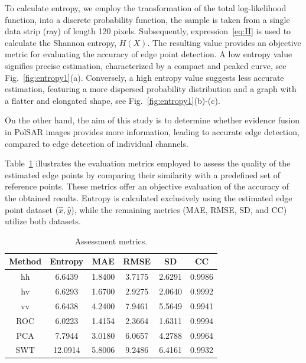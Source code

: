 \documentclass{article}
\begin{document}
To calculate entropy,  we employ the transformation of the total log-likelihood function, into a discrete probability function, the sample is taken from a single data strip (ray) of length 120 pixels.  Subsequently, expression~\eqref{eq:H} is used to calculate the Shannon entropy, $H(X)$. The resulting value provides an objective metric for evaluating the accuracy of edge point detection. A low entropy value signifies precise estimation, characterized by a compact and peaked curve, see Fig.~\ref{fig:entropy1}(a). Conversely, a high entropy value suggests less accurate estimation, featuring a more dispersed probability distribution and a graph with a flatter and elongated shape, see Fig.~\ref{fig:entropy1}(b)-(c).\par
On the other hand, the aim of this study is to determine whether evidence fusion in PolSAR images provides more information, leading to accurate edge detection, compared to edge detection of individual channels.\par
Table~\ref{tab_1} illustrates the evaluation metrics employed to assess the quality of the estimated edge points by comparing their similarity with a predefined set of reference points. These metrics offer an objective evaluation of the accuracy of the obtained results. Entropy is calculated exclusively using the estimated edge point dataset ($\hat{x},\hat{y}$), while the remaining metrics (MAE, RMSE, SD, and CC) utilize both datasets. 

\begin{table}[hbt]
  \centering
  \begin{tabular}{@{}cccccc@{}}
    \toprule
Method  &Entropy    & MAE        & RMSE       &SD       & CC \\
    \midrule
   hh  & 6.6439      & 1.8400       & 3.7175   & 2.6291   & 0.9986 \\
   hv  & 6.6293      & 1.6700       & 2.9275   & 2.0640   & 0.9992 \\
   vv  & 6.6438      & 4.2400      & 7.9461    & 5.5649   & 0.9941 \\
   ROC & 6.0223      & 1.4154      & 2.3664    & 1.6311    & 0.9994 \\
   PCA & 7.7944      & 3.0180       & 6.0657   & 4.2788  & 0.9964 \\
   SWT & 12.0914     & 5.8006      & 9.2486   & 6.4161  & 0.9932 \\
    \bottomrule
  \end{tabular}\vspace{-0.1cm}
  \caption{\small{Assessment metrics.}}
  \label{tab_1}
\end{table}
\end{document}
